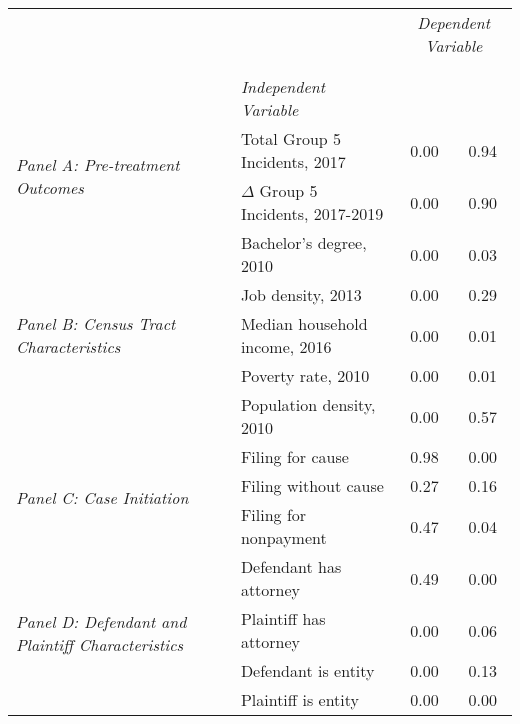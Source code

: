 \begin{tabular}{llcc}
\toprule
 &  & \multicolumn{2}{c}{\textit{Dependent Variable}} \\
\cline{3-4}
\\
 &  &  &  \\
 & \emph{Independent Variable} &  &  \\
\midrule
\multirow[c]{2}{3cm}{\textit{Panel A: Pre-treatment Outcomes}} & Total Group 5 Incidents, 2017 & 0.00 & 0.94 \\
 & $\Delta$ Group 5 Incidents, 2017-2019 & 0.00 & 0.90 \\
\cline{1-4}
\multirow[c]{5}{3cm}{\textit{Panel B: Census Tract Characteristics}} & Bachelor's degree, 2010 & 0.00 & 0.03 \\
 & Job density, 2013 & 0.00 & 0.29 \\
 & Median household income, 2016 & 0.00 & 0.01 \\
 & Poverty rate, 2010 & 0.00 & 0.01 \\
 & Population density, 2010 & 0.00 & 0.57 \\
\cline{1-4}
\multirow[c]{3}{3cm}{\textit{Panel C: Case Initiation}} & Filing for cause & 0.98 & 0.00 \\
 & Filing without cause & 0.27 & 0.16 \\
 & Filing for nonpayment & 0.47 & 0.04 \\
\cline{1-4}
\multirow[c]{4}{3cm}{\textit{Panel D: Defendant and Plaintiff Characteristics}} & Defendant has attorney & 0.49 & 0.00 \\
 & Plaintiff has attorney & 0.00 & 0.06 \\
 & Defendant is entity & 0.00 & 0.13 \\
 & Plaintiff is entity & 0.00 & 0.00 \\
\cline{1-4}
\bottomrule
\end{tabular}

